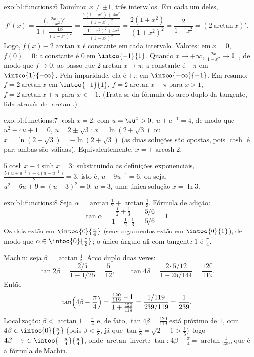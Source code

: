 \begin{solution}{exo:b1:functions:6}
Domínio: $x \neq \pm 1$, três intervalos. Em cada um deles,
\[
f'(x) = \frac{\bigl(\frac{2x}{1-x^2}\bigr)'}{1 +
\frac{4x^2}{(1-x^2)^2}}
= \frac{\frac{2(1-x^2) + 4x^2}{(1-x^2)^2}}
{\frac{(1-x^2)^2 + 4x^2}{(1-x^2)^2}}
= \frac{2(1 + x^2)}{(1 + x^2)^2} = \frac{2}{1 + x^2}
= (2\arctan x)' .
\]
Logo, $f(x) - 2\arctan x$ é constante em cada intervalo. Valores: em $x =
0$, $f(0) = 0$: a constante é $0$ em $\intoo{-1}{1}$. Quando $x \to
+\infty$, $\frac{2x}{1-x^2} \to 0^-$, de modo que $f \to 0$, ao passo que $2\arctan x
\to \pi$: a constante é $-\pi$ em $\intoo{1}{+\infty}$. Pela imparidade,
ela é $+\pi$ em $\intoo{-\infty}{-1}$. Em resumo: $f = 2\arctan x$ em
$\intoo{-1}{1}$, $f = 2\arctan x - \pi$ para $x > 1$, $f = 2\arctan x +
\pi$ para $x < -1$. (Trata-se da fórmula do arco duplo da tangente,
lida através de $\arctan$.)
\end{solution}

\begin{solution}{exo:b1:functions:7}
$\cosh x = 2$: com $u = \eu^x > 0$, $u + u^{-1} = 4$, de modo que $u^2 - 4u +
1 = 0$, $u = 2 \pm \sqrt 3$: $x = \ln(2 + \sqrt 3)$ ou $x = \ln(2 -
\sqrt 3) = -\ln(2 + \sqrt 3)$ (as duas soluções são opostas, pois
$\cosh$ é par; ambas são válidas). Equivalentemente, $x = \pm
\operatorname{arcosh} 2$.

$5\cosh x - 4\sinh x = 3$: substituindo as definições exponenciais,
$\frac{5(u + u^{-1}) - 4(u - u^{-1})}{2} = 3$, isto é, $u + 9u^{-1} =
6$, ou seja, $u^2 - 6u + 9 = (u - 3)^2 = 0$: $u = 3$, uma única solução $x =
\ln 3$.
\end{solution}

\begin{solution}{exo:b1:functions:8}
Seja $\alpha = \arctan\frac12 + \arctan\frac13$. Fórmula de adição:
\[
\tan\alpha = \frac{\frac12 + \frac13}{1 - \frac12\cdot\frac13}
= \frac{5/6}{5/6} = 1 .
\]
Os dois  estão em $\intoo{0}{\frac\pi4}$ (seus argumentos estão em
$\intoo{0}{1}$), de modo que $\alpha \in \intoo{0}{\frac\pi2}$; o único ângulo
ali com tangente $1$ é $\frac\pi4$.

Machin: seja $\beta = \arctan\frac15$. Arco duplo duas vezes:
\[
\tan 2\beta = \frac{2/5}{1 - 1/25} = \frac{5}{12},
\qquad
\tan 4\beta = \frac{2 \cdot 5/12}{1 - 25/144} = \frac{120}{119}.
\]
Então
\[
\tan\Bigl(4\beta - \frac\pi4\Bigr)
= \frac{\frac{120}{119} - 1}{1 + \frac{120}{119}}
= \frac{1/119}{239/119} = \frac{1}{239}.
\]
Localização: $\beta < \arctan 1 = \frac\pi4$ e, de fato, $\tan 4\beta =
\frac{120}{119}$ está próximo de $1$, com $4\beta \in \intoo{0}{\frac\pi2}$
(pois $\beta < \frac\pi8$, já que $\tan\frac\pi8 = \sqrt 2 - 1 > \frac15$);
logo $4\beta - \frac\pi4 \in \intoo{-\frac\pi4}{\frac\pi4}$, onde
$\arctan$ inverte $\tan$: $4\beta - \frac\pi4 =
\arctan\frac{1}{239}$, que é a fórmula de Machin.
\end{solution}

